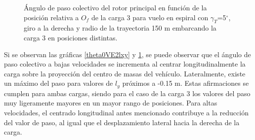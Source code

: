 \begin{figure}
	\centering
	\caption{Ángulo de paso colectivo del rotor principal en función de la posición relativa a $O_f$ de la carga 3 para vuelo en espiral con $\gamma_T$=5$^\circ$, giro a la derecha y radio de la trayectoria 150 m embarcando la carga 3 en posiciones distintas.}
	\label{theta0VE3lxy}
\end{figure}

Si se observan las gráficas \ref{theta0VE2lxy} y \ref{theta0VE3lxy}, se puede observar que el ángulo de paso colectivo a bajas velocidades se incrementa al centrar longitudinalmente la carga sobre la proyección del centro de masas del vehículo. Lateralmente, existe un máximo del paso para valores de $l_y$ próximos a -0.15 m. Estas afirmaciones se cumplen para ambas cargas, siendo para el caso de la carga 3 los valores del paso muy ligeramente mayores en un mayor rango de posiciones.
Para altas velocidades, el centrado longitudinal antes mencionado contribuye a la reducción del valor de paso, al igual que el desplazamiento lateral hacia la derecha de la carga.

